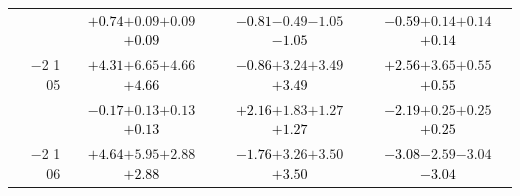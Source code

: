 \documentclass[compress]{beamer}
\begin{document}
\begin{frame}
\begin{tabular}{r | c | c | c}
          & \textcolor{black}{$+0.74$}\hspace{0.1 cm}$+0.09$\hspace{0.1 cm}$+0.09$\hspace{0.1 cm}\textcolor{black}{$+0.09$} & \textcolor{black}{$-0.81$}\hspace{0.1 cm}$-0.49$\hspace{0.1 cm}$-1.05$\hspace{0.1 cm}\textcolor{black}{$-1.05$} & \textcolor{black}{$-0.59$}\hspace{0.1 cm}$+0.14$\hspace{0.1 cm}$+0.14$\hspace{0.1 cm}\textcolor{black}{$+0.14$} \\
$-$2 1 05 & \textcolor{black}{$+4.31$}\hspace{0.1 cm}$+6.65$\hspace{0.1 cm}$+4.66$\hspace{0.1 cm}\textcolor{black}{$+4.66$} & \textcolor{black}{$-0.86$}\hspace{0.1 cm}$+3.24$\hspace{0.1 cm}$+3.49$\hspace{0.1 cm}\textcolor{black}{$+3.49$} & \textcolor{black}{$+2.56$}\hspace{0.1 cm}$+3.65$\hspace{0.1 cm}$+0.55$\hspace{0.1 cm}\textcolor{black}{$+0.55$} \\
          & \textcolor{black}{$-0.17$}\hspace{0.1 cm}$+0.13$\hspace{0.1 cm}$+0.13$\hspace{0.1 cm}\textcolor{black}{$+0.13$} & \textcolor{black}{$+2.16$}\hspace{0.1 cm}$+1.83$\hspace{0.1 cm}$+1.27$\hspace{0.1 cm}\textcolor{black}{$+1.27$} & \textcolor{black}{$-2.19$}\hspace{0.1 cm}$+0.25$\hspace{0.1 cm}$+0.25$\hspace{0.1 cm}\textcolor{black}{$+0.25$} \\
$-$2 1 06 & \textcolor{black}{$+4.64$}\hspace{0.1 cm}$+5.95$\hspace{0.1 cm}$+2.88$\hspace{0.1 cm}\textcolor{black}{$+2.88$} & \textcolor{black}{$-1.76$}\hspace{0.1 cm}$+3.26$\hspace{0.1 cm}$+3.50$\hspace{0.1 cm}\textcolor{black}{$+3.50$} & \textcolor{black}{$-3.08$}\hspace{0.1 cm}$-2.59$\hspace{0.1 cm}$-3.04$\hspace{0.1 cm}\textcolor{black}{$-3.04$} \\

\end{tabular}
\end{frame}
\end{document}
